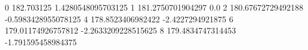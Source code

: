 0 182.703125 1.4280548095703125
1 181.2750701904297 0.0
2 180.67672729492188 -0.5983428955078125
4 178.8523406982422 -2.4227294921875
6 179.01174926757812 -2.2633209228515625
8 179.4834747314453 -1.791595458984375
